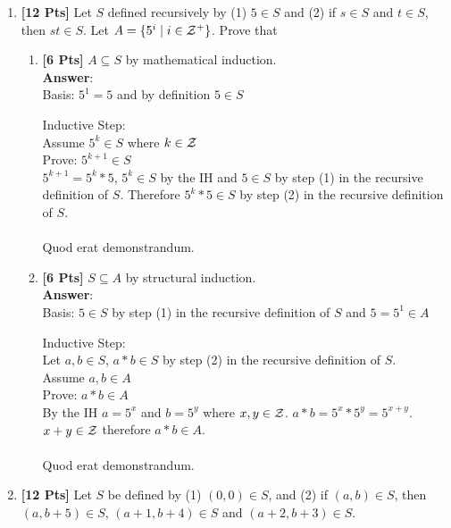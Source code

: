 \begin{enumerate}

\item {\bf [12 Pts]} Let $S$ defined recursively by (1) $5 \in S$ and (2) if $s \in S$ and $t \in S$, then $st \in S$. 
Let $A = \{5^i \mid i \in {\cal Z}^+\}$. Prove that

\begin{enumerate}

\item {\bf [6 Pts]} $A \subseteq S$ by mathematical induction.\\
\textbf{Answer}:\\

Basis: $5^1 =  5$ and by definition $5 \in S$

Inductive Step:\\
Assume $5^k \in S$ where $k \in \cal Z$\\
Prove: $5^{k+1} \in S$\\
$5^{k+1} = 5^k * 5$, $5^k \in S$ by the IH and $5 \in S$ by step (1) in the recursive definition of $S$. Therefore $5^k * 5 \in S$ by step (2) in the recursive definition of $S$.\\\\
Quod erat demonstrandum.\\

\item {\bf [6 Pts]} $S \subseteq A$ by structural induction.\\
\textbf{Answer}:\\

Basis: $5 \in S$ by step (1) in the recursive definition of $S$ and $5 = 5^1 \in A$

Inductive Step:\\
Let $a,b \in S$, $a * b \in S$ by step (2) in the recursive definition of $S$.\\
Assume $a,b \in A$\\
Prove: $a * b \in A$\\
By the IH $a = 5^x$ and $b = 5^y$ where $x,y \in \cal Z$. $a * b = 5^x * 5^y = 5^{x+y}$. $x + y \in \cal Z$ therefore $a*b \in A$.\\\\
Quod erat demonstrandum.\\

\end{enumerate}

\clearpage

\item {\bf [12 Pts]} Let $S$ be defined by (1) $(0,0) \in S$, and (2) if $(a,b) \in S$, 
then $(a,b+5) \in S$, $(a+1,b+4) \in S$ and $(a+2,b+3) \in S$.


\end{enumerate}
